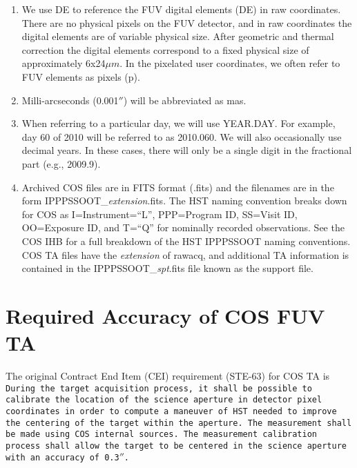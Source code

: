 \documentclass[12pt]{article}
\newcommand{\arcsec}{\ensuremath{''}}
\newcommand{\psiafdate}{2010.060}
\begin{document}
\begin{enumerate}
{		valued corner (C) and full size (S) for both X and Y. A box is fully specified by
		giving its XC, XS, YC, \& YS. In this ISR, these will always be given in detector coordinates.}
	\item{We use DE to reference the FUV digital elements (DE) in raw coordinates. There are no physical pixels on the FUV detector, and in raw coordinates the digital elements are of variable physical size. After geometric and thermal correction the digital elements correspond to a fixed physical size of approximately 6x24$\mu m$. In the pixelated user coordinates, we often refer to FUV elements as pixels (p). }
	\item{Milli-arcseconds (0.001\arcsec) will be abbreviated as mas. }
	\item{When referring to a particular day, we will use YEAR.DAY. For example, day 60 of 2010 will be referred to as \psiafdate. We will also occasionally use decimal years. In these cases, there will only be a single digit in the fractional part (e.g., 2009.9).}
	\item{Archived COS files are in FITS format (.fits) and the filenames are in the form {\sf IPPPSSOOT\_{\it extension}.fits}.
The HST naming convention breaks down for COS as I=Instrument=``L'', PPP=Program ID, SS=Visit ID, OO=Exposure ID,
and T=``Q'' for nominally recorded observations. See the COS IHB for a full breakdown of the HST IPPPSSOOT naming conventions.
COS TA files have the {\it extension} of {\sf rawacq}, and additional
TA information is contained in the {\sf IPPPSSOOT\_{\it spt}.fits} file known as the support file.}
\end{enumerate}
\clearpage
\vspace{-0.4cm}
\section{Required Accuracy of COS FUV TA}\label{sec:accuracy}
\vspace{-0.3cm}
The original Contract End Item (CEI) requirement (STE-63) for COS TA is \\

\footnotesize
\noindent \texttt{During the target acquisition process, it shall be possible to calibrate the location of the science aperture in detector pixel
coordinates in order to compute a maneuver of HST needed to improve the centering of the target within the aperture.
The measurement shall be made using COS internal sources.
The measurement calibration process shall allow the target to be centered
in the science aperture with an accuracy of 0.3\arcsec.}\\
\end{document}
